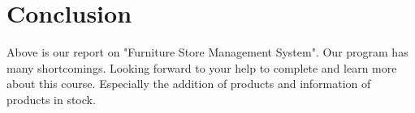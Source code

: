 \section{Conclusion}
\hspace{0.7cm} Above is our report on "Furniture Store Management System". Our program has many shortcomings. Looking forward to your help to complete and learn more about this course. Especially the addition of products and information of products in stock.